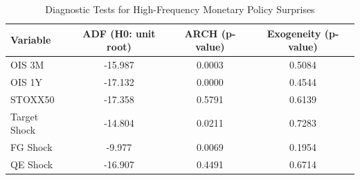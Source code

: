 \begin{table}[ht]
\centering
\begin{tabular}{lccc}
  \hline
Variable & ADF (H0: unit root) & ARCH (p-value) & Exogeneity (p-value) \\ 
  \hline
OIS 3M & -15.987 & 0.0003 & 0.5084 \\ 
  OIS 1Y & -17.132 & 0.0000 & 0.4544 \\ 
  STOXX50 & -17.358 & 0.5791 & 0.6139 \\ 
  Target Shock & -14.804 & 0.0211 & 0.7283 \\ 
  FG Shock & -9.977 & 0.0069 & 0.1954 \\ 
  QE Shock & -16.907 & 0.4491 & 0.6714 \\ 
   \hline
\end{tabular}
\caption{Diagnostic Tests for High-Frequency Monetary Policy Surprises} 
\label{tab:shock_diagnostics}
\end{table}
